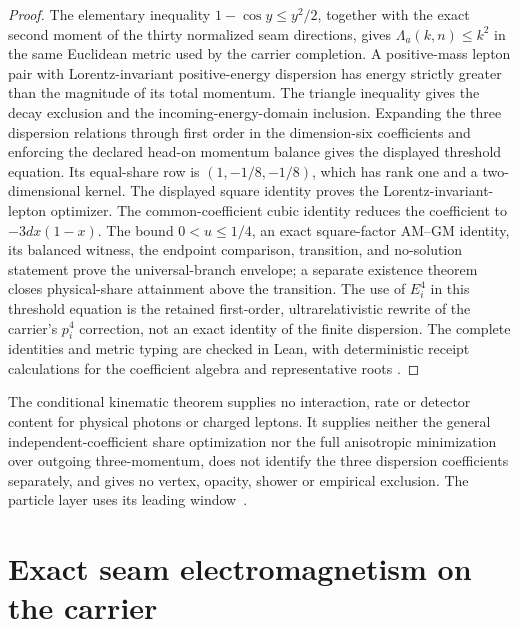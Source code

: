 \documentclass[11pt]{article}
\theoremstyle{remark}
\theoremstyle{plain}
\begin{document}
\begin{proof}
The elementary inequality \(1-\cos y\leq y^2/2\), together with the exact
second moment of the thirty normalized seam directions, gives
\(\Lambda_a(k,n)\leq k^2\) in the same Euclidean metric used by the carrier
completion. A positive-mass lepton pair with Lorentz-invariant positive-energy
dispersion has energy
strictly greater than the magnitude of its total momentum. The triangle
inequality gives the decay exclusion and the incoming-energy-domain
inclusion. Expanding the three dispersion relations through first order in
the dimension-six coefficients and enforcing the declared head-on momentum
balance gives the displayed threshold equation. Its equal-share row is
\((1,-1/8,-1/8)\), which has rank one and a two-dimensional kernel. The
displayed square identity proves the Lorentz-invariant-lepton optimizer. The
common-coefficient cubic identity reduces the coefficient to
\(-3d x(1-x)\). The bound \(0<u\le1/4\), an exact square-factor AM--GM
identity, its balanced witness, the endpoint comparison, transition, and
no-solution statement prove the universal-branch envelope; a separate
existence theorem closes physical-share attainment above the transition. The
use of \(E_i^4\) in this threshold equation is the retained first-order,
ultrarelativistic rewrite of the carrier's \(p_i^4\) correction, not an exact
identity of the finite dispersion. The complete
identities and metric typing are checked in Lean, with deterministic receipt
calculations for the coefficient algebra and representative roots
\cite{ophrepo}.
\end{proof}

The conditional kinematic theorem supplies no interaction, rate or detector
content for physical photons or charged leptons. It supplies neither the
general independent-coefficient share optimization nor the full anisotropic
minimization over outgoing three-momentum, does not identify the three
dispersion coefficients separately, and gives no vertex, opacity, shower or
empirical exclusion. The particle layer uses its leading
window~\cite{ophparticles}.
\section{Exact seam electromagnetism on the carrier}
\label{sec:seam-electromagnetism}
\end{document}
